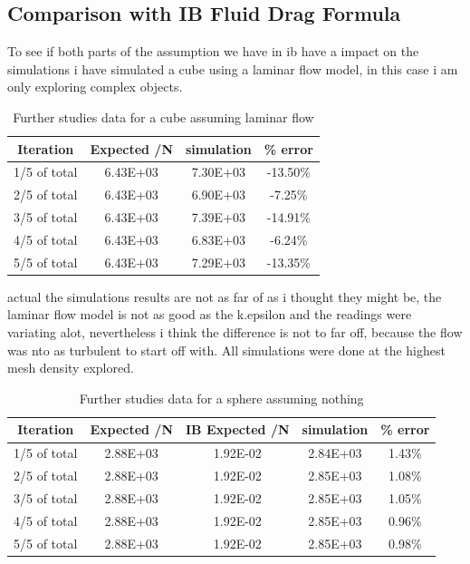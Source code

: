 \documentclass[12pt,a4paper]{article}
\begin{document}
\subsection{Comparison with IB Fluid Drag Formula}

To see if both parts of the assumption we have in ib have a impact on the simulations i have simulated a cube using a laminar flow model, in this case i am only exploring complex objects. 

\begin{table}[H]
\centering
\caption{Further studies data for a cube assuming laminar flow}
\begin{tabular}{|c|c|c|c|}
\hline
\textbf{Iteration} & \textbf{Expected /N} & \textbf{simulation} & \textbf{\% error} \\
\hline
1/5 of total & 6.43E+03 & 7.30E+03 & -13.50\% \\
\hline
2/5 of total & 6.43E+03 & 6.90E+03 & -7.25\% \\
\hline
3/5 of total & 6.43E+03 & 7.39E+03 & -14.91\% \\
\hline
4/5 of total & 6.43E+03 & 6.83E+03 & -6.24\% \\
\hline
5/5 of total & 6.43E+03 & 7.29E+03 & -13.35\% \\
\hline
\end{tabular}
\end{table}

actual the simulations results are not as far of as i thought they might be, the laminar flow model is not as good as the k.epsilon and the readings were variating alot, nevertheless i think the difference is not to far off, because the flow was nto as turbulent to start off with. All simulations were done at the highest mesh density explored.


\begin{table}[H]
\centering
\caption{Further studies data for a sphere assuming nothing}
\begin{tabular}{|c|c|c|c|c|}
\hline
\textbf{Iteration} & \textbf{Expected /N} & \textbf{IB Expected /N} & \textbf{simulation} & \textbf{\% error} \\
\hline
1/5 of total & 2.88E+03 & 1.92E-02 & 2.84E+03 & 1.43\% \\
\hline
2/5 of total & 2.88E+03 & 1.92E-02 & 2.85E+03 & 1.08\% \\
\hline
3/5 of total & 2.88E+03 & 1.92E-02 & 2.85E+03 & 1.05\% \\
\hline
4/5 of total & 2.88E+03 & 1.92E-02 & 2.85E+03 & 0.96\% \\
\hline
5/5 of total & 2.88E+03 & 1.92E-02 & 2.85E+03 & 0.98\% \\
\hline
\end{tabular}
\end{table}
\end{document}
